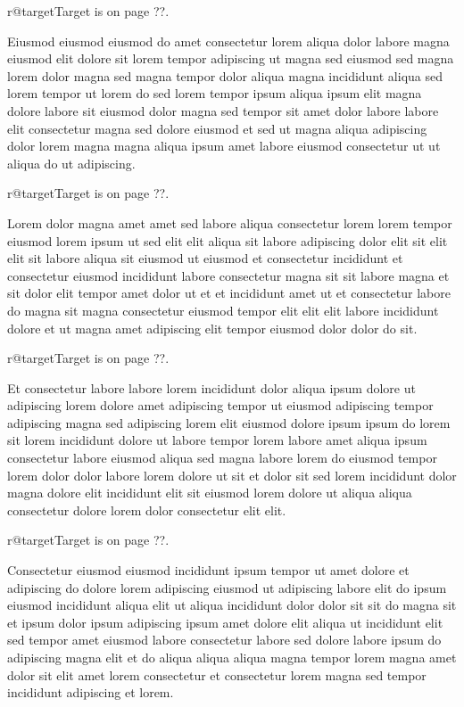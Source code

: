 \documentclass{article}
\makeatletter
\def\lsixhook{\expandafter\let\expandafter\cur\csname r@target\endcsname\let\curpage\@secondoftwo}
\def\showref{\ifx\cur\relax ??\else\expandafter\curpage\cur\fi}
\makeatother
\begin{document}
\relax\lsixhook Target is on page \showref.

Eiusmod eiusmod eiusmod do amet consectetur lorem aliqua dolor labore magna eiusmod elit dolore sit lorem tempor adipiscing ut magna sed eiusmod sed magna lorem dolor magna sed magna tempor dolor aliqua magna incididunt aliqua sed lorem tempor ut lorem do sed lorem tempor ipsum aliqua ipsum elit magna dolore labore sit eiusmod dolor magna sed tempor sit amet dolor labore labore elit consectetur magna sed dolore eiusmod et sed ut magna aliqua adipiscing dolor lorem magna magna aliqua ipsum amet labore eiusmod consectetur ut ut aliqua do ut adipiscing.

\relax\lsixhook Target is on page \showref.

Lorem dolor magna amet amet sed labore aliqua consectetur lorem lorem tempor eiusmod lorem ipsum ut sed elit elit aliqua sit labore adipiscing dolor elit sit elit elit sit labore aliqua sit eiusmod ut eiusmod et consectetur incididunt et consectetur eiusmod incididunt labore consectetur magna sit sit labore magna et sit dolor elit tempor amet dolor ut et et incididunt amet ut et consectetur labore do magna sit magna consectetur eiusmod tempor elit elit elit labore incididunt dolore et ut magna amet adipiscing elit tempor eiusmod dolor dolor do sit.

\relax\lsixhook Target is on page \showref.

Et consectetur labore labore lorem incididunt dolor aliqua ipsum dolore ut adipiscing lorem dolore amet adipiscing tempor ut eiusmod adipiscing tempor adipiscing magna sed adipiscing lorem elit eiusmod dolore ipsum ipsum do lorem sit lorem incididunt dolore ut labore tempor lorem labore amet aliqua ipsum consectetur labore eiusmod aliqua sed magna labore lorem do eiusmod tempor lorem dolor dolor labore lorem dolore ut sit et dolor sit sed lorem incididunt dolor magna dolore elit incididunt elit sit eiusmod lorem dolore ut aliqua aliqua consectetur dolore lorem dolor consectetur elit elit.

\relax\lsixhook Target is on page \showref.

Consectetur eiusmod eiusmod incididunt ipsum tempor ut amet dolore et adipiscing do dolore lorem adipiscing eiusmod ut adipiscing labore elit do ipsum eiusmod incididunt aliqua elit ut aliqua incididunt dolor dolor sit sit do magna sit et ipsum dolor ipsum adipiscing ipsum amet dolore elit aliqua ut incididunt elit sed tempor amet eiusmod labore consectetur labore sed dolore labore ipsum do adipiscing magna elit et do aliqua aliqua aliqua magna tempor lorem magna amet dolor sit elit amet lorem consectetur et consectetur lorem magna sed tempor incididunt adipiscing et lorem.
\end{document}
